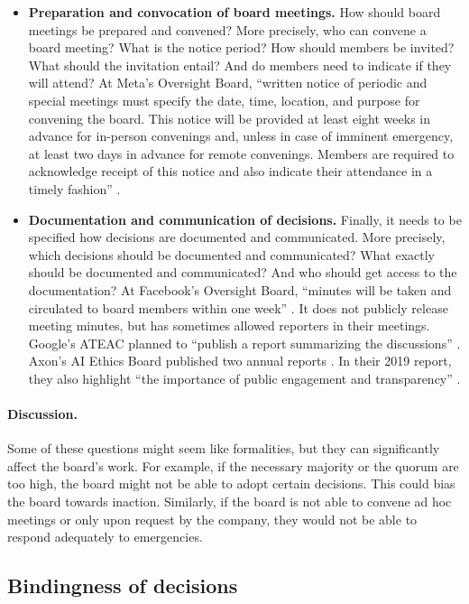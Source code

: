 \documentclass{article}
\begin{document}
\begin{itemize}[leftmargin=2em]
    \item \textbf{Preparation and convocation of board meetings.} How should board meetings be prepared and convened? More precisely, who can convene a board meeting? What is the notice period? How should members be invited? What should the invitation entail? And do members need to indicate if they will attend? At Meta’s Oversight Board, “written notice of periodic and special meetings must specify the date, time, location, and purpose for convening the board. This notice will be provided at least eight weeks in advance for in-person convenings and, unless in case of imminent emergency, at least two days in advance for remote convenings. Members are required to acknowledge receipt of this notice and also indicate their attendance in a timely fashion” \cite{oversight2022bylaws}.
    \item \textbf{Documentation and communication of decisions.} Finally, it needs to be specified how decisions are documented and communicated. More precisely, which decisions should be documented and communicated? What exactly should be documented and communicated? And who should get access to the documentation? At Facebook’s Oversight Board, “minutes will be taken and circulated to board members within one week” \cite{oversight2022bylaws}. It does not publicly release meeting minutes, but has sometimes allowed reporters in their meetings. Google’s ATEAC planned to “publish a report summarizing the discussions” \cite{walker2019external}. Axon’s AI Ethics Board published two annual reports \cite{policingproject2020reports}. In their 2019 report, they also highlight “the importance of public engagement and transparency” \cite{axon2019policing}.
\end{itemize}

\paragraph{Discussion.} Some of these questions might seem like formalities, but they can significantly affect the board’s work. For example, if the necessary majority or the quorum are too high, the board might not be able to adopt certain decisions. This could bias the board towards inaction. Similarly, if the board is not able to convene ad hoc meetings or only upon request by the company, they would not be able to respond adequately to emergencies.

\subsection{Bindingness of decisions}\label{Ch:5:2:binding}
\end{document}
